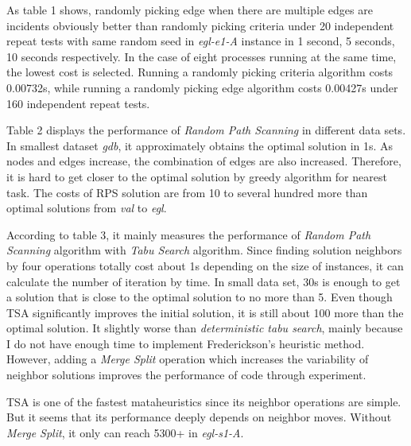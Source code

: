 \documentclass[conference,compsoc]{IEEEtran}
\begin{document}
\par As table 1 shows, randomly picking edge when there are multiple edges are incidents obviously better than randomly picking criteria under 20 independent repeat tests with same random seed in \textit{egl-e1-A} instance in 1 second, 5 seconds, 10 seconds respectively. In the case of eight processes running at the same time, the lowest cost is selected. Running a randomly picking criteria algorithm costs 0.00732s, while running a randomly picking edge algorithm costs 0.00427s under 160 independent repeat tests.
\par Table 2 displays the performance of \textit{Random Path Scanning} in different data sets. In smallest dataset \textit{gdb}, it approximately obtains the optimal solution in 1s. As nodes and edges increase, the combination of edges are also increased. Therefore, it is hard to get closer to the optimal solution by greedy algorithm for nearest task. The costs of RPS solution are from 10 to several hundred more than optimal solutions from \textit{val} to \textit{egl}.
\par According to table 3, it mainly measures the performance of \textit{Random Path Scanning} algorithm with \textit{Tabu Search} algorithm. Since finding solution neighbors by four operations totally cost about 1s depending on the size of instances, it can calculate the number of iteration by time. In small data set, 30s is enough to get a solution that is close to the optimal solution to no more than 5. Even though TSA significantly improves the initial solution, it is still about 100 more than the optimal solution. It slightly worse than \textit{deterministic tabu search}, mainly because I do not have enough time to implement Frederickson's heuristic method. However, adding a \textit{Merge Split} operation which increases the variability of neighbor solutions improves the performance of code through experiment.
\par TSA is one of the fastest mataheuristics since its neighbor operations are simple. But it seems that its performance deeply depends on neighbor moves. Without \textit{Merge Split}, it only can reach 5300+ in \textit{egl-s1-A}. 









\end{document}
